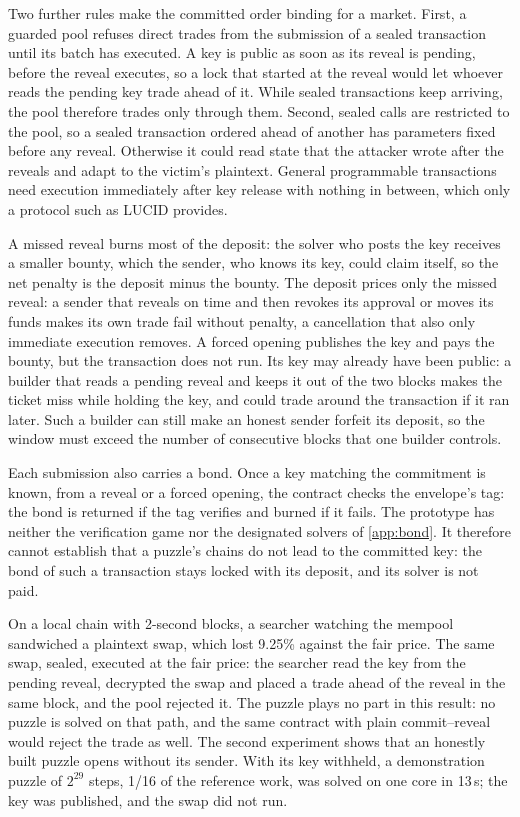 Two further rules make the committed order binding for a market. First, a guarded pool refuses direct trades from the submission of a sealed transaction until its batch has executed. A key is public as soon as its reveal is pending, before the reveal executes, so a lock that started at the reveal would let whoever reads the pending key trade ahead of it. While sealed transactions keep arriving, the pool therefore trades only through them. Second, sealed calls are restricted to the pool, so a sealed transaction ordered ahead of another has parameters fixed before any reveal. Otherwise it could read state that the attacker wrote after the reveals and adapt to the victim's plaintext. General programmable transactions need execution immediately after key release with nothing in between, which only a protocol such as LUCID provides.

A missed reveal burns most of the deposit: the solver who posts the key receives a smaller bounty, which the sender, who knows its key, could claim itself, so the net penalty is the deposit minus the bounty. The deposit prices only the missed reveal: a sender that reveals on time and then revokes its approval or moves its funds makes its own trade fail without penalty, a cancellation that also only immediate execution removes. A forced opening publishes the key and pays the bounty, but the transaction does not run. Its key may already have been public: a builder that reads a pending reveal and keeps it out of the two blocks makes the ticket miss while holding the key, and could trade around the transaction if it ran later. Such a builder can still make an honest sender forfeit its deposit, so the window must exceed the number of consecutive blocks that one builder controls.

Each submission also carries a bond. Once a key matching the commitment is known, from a reveal or a forced opening, the contract checks the envelope's tag: the bond is returned if the tag verifies and burned if it fails. The prototype has neither the verification game nor the designated solvers of \cref{app:bond}. It therefore cannot establish that a puzzle's chains do not lead to the committed key: the bond of such a transaction stays locked with its deposit, and its solver is not paid.

On a local chain with 2-second blocks, a searcher watching the mempool sandwiched a plaintext swap, which lost 9.25\% against the fair price. The same swap, sealed, executed at the fair price: the searcher read the key from the pending reveal, decrypted the swap and placed a trade ahead of the reveal in the same block, and the pool rejected it. The puzzle plays no part in this result: no puzzle is solved on that path, and the same contract with plain commit--reveal would reject the trade as well. The second experiment shows that an honestly built puzzle opens without its sender. With its key withheld, a demonstration puzzle of $2^{29}$ steps, 1/16 of the reference work, was solved on one core in 13\,s; the key was published, and the swap did not run.

